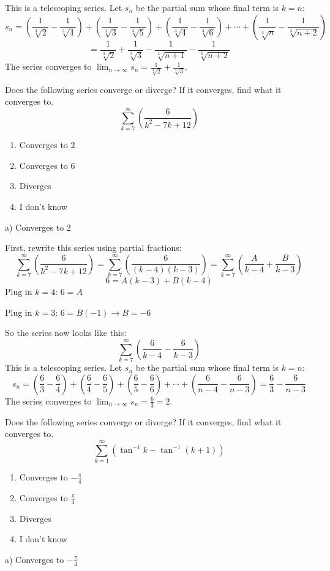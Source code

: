 \documentclass[addpoints,12pt,answers]{exam}
\begin{document}
\begin{questions}
\begin{solution}
    This is a telescoping series. Let $s_n$ be the partial sum whose final term is $k=n$:
    $$s_n=\left(\frac{1}{\sqrt[3]{2}}-\frac{1}{\sqrt[3]{4}}\right)+\left(\frac{1}{\sqrt[3]{3}}-\frac{1}{\sqrt[3]{5}}\right)+\left(\frac{1}{\sqrt[3]{4}}-\frac{1}{\sqrt[3]{6}}\right)+\cdots+\left(\frac{1}{\sqrt[3]{n}}-\frac{1}{\sqrt[3]{n+2}}\right)$$
    $$=\frac{1}{\sqrt[3]{2}}+\frac{1}{\sqrt[3]{3}}-\frac{1}{\sqrt[3]{n+1}}-\frac{1}{\sqrt[3]{n+2}}$$
    The series converges to $\displaystyle\lim_{n\to\infty}s_n=\frac{1}{\sqrt[3]{2}}+\frac{1}{\sqrt[3]{3}}$.
  \end{solution}
  \newpage
  \question
  Does the following series converge or diverge? If it converges, find what it converges to.
  $$\sum_{k=7}^\infty\left(\frac{6}{k^2-7k+12}\right)$$
  \begin{enumerate}[label=\alph*)]
    \item
    Converges to 2
    \item
    Converges to 6
    \item
    Diverges
    \item
    I don't know
  \end{enumerate}
  \begin{solution}
    a) Converges to 2
    
    First, rewrite this series using partial fractions:
    $$\sum_{k=7}^\infty\left(\frac{6}{k^2-7k+12}\right)=\sum_{k=7}^\infty\left(\frac{6}{(k-4)(k-3)}\right)=\sum_{k=7}^\infty\left(\frac{A}{k-4}+\frac{B}{k-3}\right)$$
    $$6=A(k-3)+B(k-4)$$
    Plug in $k=4$: $6=A$
    
    Plug in $k=3$: $6=B(-1)\rightarrow B=-6$
    
    So the series now looks like this:
    $$\sum_{k=7}^\infty\left(\frac{6}{k-4}-\frac{6}{k-3}\right)$$
    This is a telescoping series. Let $s_n$ be the partial sum whose final term is $k=n$:
    $$s_n=\left(\frac{6}{3}-\frac{6}{4}\right)+\left(\frac{6}{4}-\frac{6}{5}\right)+\left(\frac{6}{5}-\frac{6}{6}\right)+\cdots+\left(\frac{6}{n-4}-\frac{6}{n-3}\right)=\frac{6}{3}-\frac{6}{n-3}$$
    The series converges to $\displaystyle\lim_{n\to\infty}s_n=\frac{6}{3}=2$.
  \end{solution}
  \newpage
  \question
  Does the following series converge or diverge? If it converges, find what it converges to.
  $$\sum_{k=1}^\infty\left(\tan^{-1}k-\tan^{-1}(k+1)\right)$$
  \begin{enumerate}[label=\alph*)]
    \item
    Converges to $\displaystyle-\frac{\pi}{4}$
    \item
    Converges to $\displaystyle\frac{\pi}{4}$
    \item
    Diverges
    \item
    I don't know
  \end{enumerate}
  \begin{solution}
    a) Converges to $\displaystyle-\frac{\pi}{4}$
    

\end{solution}
\end{questions}
\end{document}
